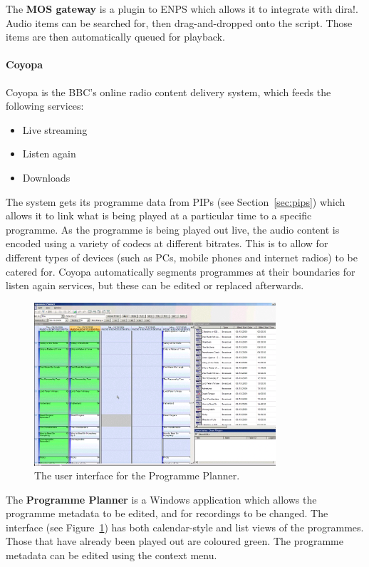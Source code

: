 The \textbf{MOS gateway} is a plugin to ENPS which allows it to integrate with
dira!. Audio items can be searched for, then drag-and-dropped onto the script.
Those items are then automatically queued for playback.

\paragraph{Coyopa}\label{sec:coyopa}
Coyopa is the BBC's online radio content delivery system, which feeds the
following services:
{\singlespacing
\begin{itemize}
  \item Live streaming
  \item Listen again
  \item Downloads
\end{itemize}
}

The system gets its programme data from PIPs (see Section~\ref{sec:pips}) which
allows it to link what is being played at a particular time to a specific
programme. As the programme is being played out live, the audio content is
encoded using a variety of codecs at different bitrates. This is to allow for
different types of devices (such as PCs, mobile phones and internet radios) to
be catered for.  Coyopa automatically segments programmes at their
boundaries for listen again services, but these can be edited or replaced
afterwards.

\begin{figure}[p]
\centering
\includegraphics[width=0.8\textwidth]{figs/progplanner.png}
\caption{The user interface for the Programme Planner.}
\label{fig:progplan}
\end{figure}

The \textbf{Programme Planner} is a Windows application which allows the
programme metadata to be edited, and for recordings to be changed. The
interface (see Figure~\ref{fig:progplan}) has both calendar-style and list
views of the programmes. Those that have already been played out are coloured
green. The programme metadata can be edited using the context menu.

